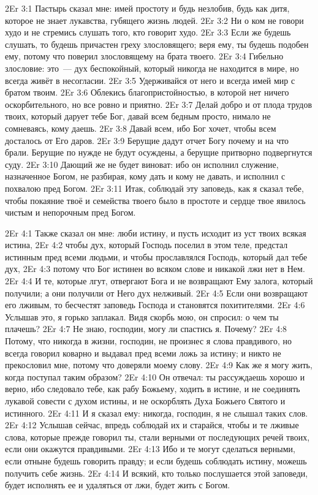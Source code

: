 \vs 2Er 3:1
Пастырь
сказал мне: имей простоту и будь незлобив, будь как дитя, которое не знает
лукавства, губящего жизнь людей.
\vs 2Er 3:2
Ни о ком не говори худо и
не стремись слушать того, кто говорит худо.
\vs 2Er 3:3
Если же будешь слушать, то
будешь причастен греху злословящего; веря ему, ты будешь подобен ему, потому
что поверил злословящему на брата твоего.
\vs 2Er 3:4
Гибельно злословие: это~--- дух беспокойный,
который никогда не находится в мире, но всегда живёт в несогласии.
\vs 2Er 3:5
Удерживайся от него и
всегда имей мир с братом твоим.
\vs 2Er 3:6
Облекись
благопристойностью, в которой нет ничего оскорбительного, но все ровно и
приятно.
\vs 2Er 3:7
Делай добро и от плода
трудов твоих, который дарует тебе Бог, давай всем бедным просто, нимало не
сомневаясь, кому даешь.
\vs 2Er 3:8
Давай всем, ибо Бог хочет,
чтобы всем досталось от Его даров.
\vs 2Er 3:9
Берущие дадут отчет Богу
почему и на что брали. Берущие по нужде не будут осуждены, а берущие притворно
подвергнутся суду.
\vs 2Er 3:10
Дающий же не будет
виноват: ибо он исполнил служение, назначенное Богом, не разбирая, кому дать и
кому не давать, и исполнил с похвалою пред Богом.
\vs 2Er 3:11
Итак, соблюдай эту
заповедь, как я сказал тебе, чтобы покаяние твоё и семейства твоего было в
простоте и сердце твое явилось чистым и непорочным пред Богом.

\vs 2Er 4:1
Также
сказал он мне: люби истину, и пусть исходит из уст твоих всякая истина,
\vs 2Er 4:2
чтобы дух, который Господь
поселил в этом теле, предстал истинным пред всеми людьми, и чтобы прославлялся
Господь, который дал тебе дух,
\vs 2Er 4:3
потому что Бог истинен во
всяком слове и никакой лжи нет в Нем.
\vs 2Er 4:4
И те, которые лгут,
отвергают Бога и не возвращают Ему залога, который получили; а они получили от
Него дух нелживый.
\vs 2Er 4:5
Если они возвращают его
лживым, то бесчестят заповедь Господа и становятся похитителями.
\vs 2Er 4:6
Услышав это, я горько
заплакал. Видя скорбь мою, он спросил: о чем ты плачешь?
\vs 2Er 4:7
Не знаю, господин, могу ли
спастись я. Почему?
\vs 2Er 4:8
Потому, что никогда в
жизни, господин, не произнес я слова правдивого, но всегда говорил коварно и
выдавал пред всеми ложь за истину; и никто не прекословил мне, потому что
доверяли моему слову.
\vs 2Er 4:9
Как же я могу жить, когда
поступал таким образом?
\vs 2Er 4:10
Он отвечал: ты
рассуждаешь хорошо и верно, ибо следовало тебе, как рабу Божьему, ходить в
истине, и не соединять лукавой совести с духом истины, и не оскорблять Духа
Божьего Святого и истинного.
\vs 2Er 4:11
И я сказал ему: никогда,
господин, я не слышал таких слов.
\vs 2Er 4:12
Услышав сейчас, впредь
соблюдай их и старайся, чтобы и те лживые слова, которые прежде говорил ты,
стали верными от последующих речей твоих, если они окажутся правдивыми.
\vs 2Er 4:13
Ибо и те могут сделаться
верными, если отныне будешь говорить правду; и если будешь соблюдать истину,
можешь получить себе жизнь.
\vs 2Er 4:14
И всякий, кто только
послушается этой заповеди, будет исполнять ее и удаляться от лжи, будет жить
с Богом.

